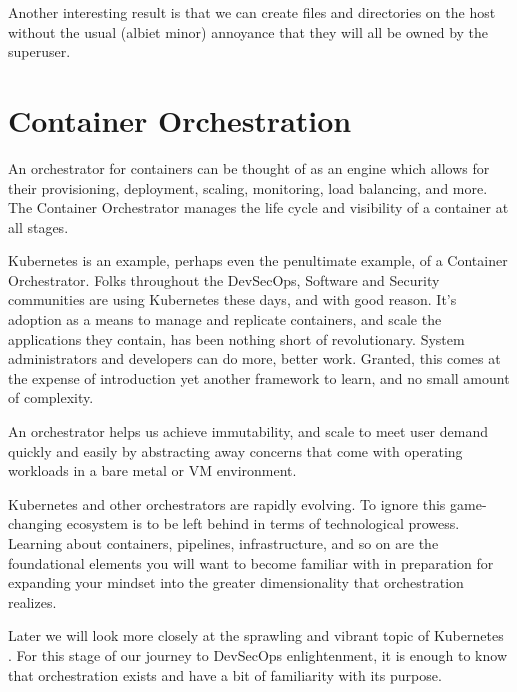 \justifying
Another interesting result is that we can create files and directories on the host without the usual (albiet minor) annoyance
that they will all be owned by the superuser.

\section{Container Orchestration}

\justifying
An orchestrator for containers can be thought of as an engine which allows for their provisioning, deployment, scaling, monitoring, load
balancing, and more. The Container Orchestrator manages the life cycle and visibility of a container at all stages.

\justifying
Kubernetes is an example, perhaps even the penultimate example, of a Container Orchestrator.
Folks throughout the DevSecOps, Software and Security communities are using Kubernetes these days, and
with good reason. It's adoption as a means to manage and replicate containers, and scale the applications they contain,
has been nothing short of revolutionary. System administrators and developers can do more, better work. Granted, this comes at
the expense of introduction yet another framework to learn, and no small amount of complexity.

\justifying
An orchestrator helps us achieve immutability, and scale to meet user demand quickly and easily by abstracting away
concerns that come with operating workloads in a bare metal or VM environment.

\justifying
Kubernetes and other orchestrators are rapidly evolving. To ignore this game-changing ecosystem is to be left behind in terms of technological prowess. Learning about containers, pipelines, infrastructure, and
so on are the foundational elements you will want to become familiar with in preparation for expanding your mindset into the greater
dimensionality that orchestration realizes.

\justifying
Later we will look more closely at the sprawling and vibrant topic of Kubernetes . For this stage of our journey to DevSecOps
enlightenment, it is enough to know that orchestration exists and have a bit of familiarity with its purpose.
